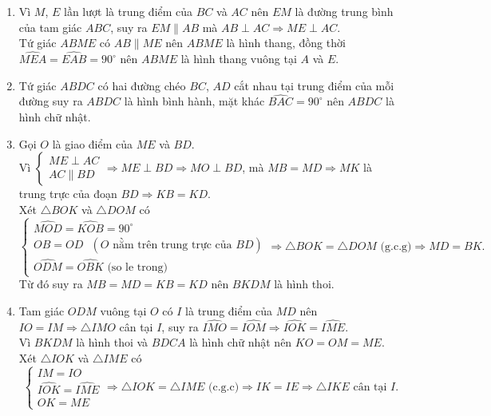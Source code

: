 \begin{bt}
{\begin{center}
		\end{center}
		\begin{enumerate}
			\item Vì $M$, $E$ lần lượt là trung điểm của $BC$ và $AC$ nên $EM$ là đường trung bình của tam giác $ABC$, suy ra $EM\parallel AB$ mà $AB\perp AC\Rightarrow ME\perp AC$.\\
			Tứ giác $ABME$ có $AB\parallel ME$ nên $ABME$ là hình thang, đồng thời $\widehat{MEA}=\widehat{EAB}=90^\circ$ nên $ABME$ là hình thang vuông tại $A$ và $E$.
			\item Tứ giác $ABDC$ có hai đường chéo $BC$, $AD$ cắt nhau tại trung điểm của mỗi đường suy ra $ABDC$ là hình bình hành, mặt khác $\widehat{BAC}=90^\circ $ nên $ABDC$ là hình chữ nhật.
			\item Gọi $O$ là giao điểm của $ME$ và $BD$.\\
			Vì $\begin{cases}
				ME\perp AC\\
				AC\parallel BD
			\end{cases}\Rightarrow ME\perp BD\Rightarrow MO\perp BD$, mà $MB=MD\Rightarrow MK$ là trung trực của đoạn $BD\Rightarrow KB=KD$.\\
			Xét $\triangle BOK$ và $\triangle DOM$ có
			$$\begin{cases}
			\widehat{MOD}=\widehat{KOB}=90^\circ\\
			OB=OD\text{ }(O \text{ nằm trên trung trực của }BD)\\
			\widehat{ODM}=\widehat{OBK} \text{ (so le trong)}
			\end{cases}\Rightarrow \triangle BOK=\triangle DOM \text{ (g.c.g)}\Rightarrow MD=BK.$$
			Từ đó suy ra $MB=MD=KB=KD$ nên $BKDM$ là hình thoi.
			\item Tam giác $ODM$ vuông tại $O$ có $I$ là trung điểm của $MD$ nên $IO=IM\Rightarrow \triangle IMO$ cân tại $I$, suy ra $\widehat{IMO}=\widehat{IOM}\Rightarrow \widehat{IOK}=\widehat{IME}.$\\
			Vì $BKDM$ là hình thoi và $BDCA$ là hình chữ nhật nên $KO=OM=ME$.\\
			Xét $\triangle IOK$ và $\triangle IME$ có
			$$\begin{cases}
				IM=IO\\
				\widehat{IOK}=\widehat{IME}\\
				OK=ME
			\end{cases}\Rightarrow \triangle IOK=\triangle IME\text{ (c.g.c)}\Rightarrow IK=IE\Rightarrow \triangle IKE\text{ cân tại }I.$$
			
		\end{enumerate}
	}
\end{bt}

